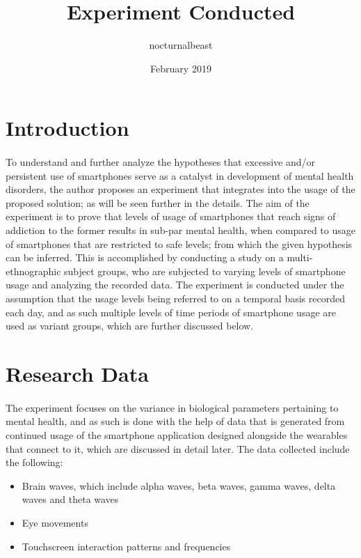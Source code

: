 \documentclass{article}
\title{Experiment Conducted}
\author{nocturnalbeast}
\date{February 2019}
\begin{document}
\maketitle

\section{Introduction}
\paragraph{}To understand and further analyze the hypotheses that excessive and/or persistent use of smartphones serve as a catalyst in development of mental health disorders, the author proposes an experiment that integrates into the usage of the proposed solution; as will be seen further in the details. The aim of the experiment is to prove that levels of usage of smartphones that reach signs of addiction to the former results in sub-par mental health, when compared to usage of smartphones that are restricted to safe levels; from which the given hypothesis can be inferred. This is accomplished by conducting a study on a multi-ethnographic subject groups, who are subjected to varying levels of smartphone usage and analyzing the recorded data. The experiment is conducted under the assumption that the usage levels being referred to on a temporal basis recorded each day, and as such multiple levels of time periods of smartphone usage are used as variant groups, which are further discussed below.

\section{Research Data}
\paragraph{}The experiment focuses on the variance in biological parameters pertaining to mental health, and as such is done with the help of data that is generated from continued usage of the smartphone application designed alongside the wearables that connect to it, which are discussed in detail later. The data collected include the following:

\begin{itemize}
    \item Brain waves, which include alpha waves, beta waves, gamma waves, delta waves and theta waves
    \item Eye movements
    \item Touchscreen interaction patterns and frequencies
\end{itemize}
\end{document}
